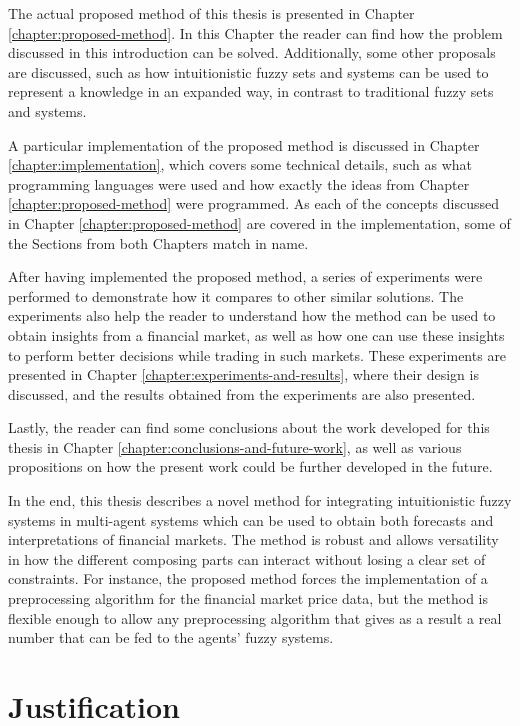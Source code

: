 The actual proposed method of this thesis is presented in Chapter
\ref{chapter:proposed-method}. In this Chapter the reader can find how the
problem discussed in this introduction can be
solved. Additionally, some other proposals are discussed, such as how
intuitionistic fuzzy sets and systems can be used to represent a knowledge in an
expanded way, in contrast to traditional fuzzy sets and systems.

A particular implementation of the proposed method is discussed in Chapter
\ref{chapter:implementation}, which covers some technical details, such as what
programming languages were used and how exactly the ideas from Chapter
\ref{chapter:proposed-method} were programmed. As each of the concepts discussed
in Chapter \ref{chapter:proposed-method} are covered in the implementation, some
of the Sections from both Chapters match in name.

After having implemented the proposed method, a series of experiments were
performed to demonstrate how it compares to other similar solutions. The
experiments also help the reader to understand how the method can be used to
obtain insights from a financial market, as well as how one can use these
insights to perform better decisions while trading in such markets. These %
experiments are presented in Chapter \ref{chapter:experiments-and-results}, where their
design is discussed, and the results obtained from the experiments are also presented.

Lastly, the reader can find some conclusions about the work developed for this
thesis in Chapter \ref{chapter:conclusions-and-future-work}, as well as various propositions on
how the present work could be further developed in the future.

In the end, this thesis describes a novel method for integrating intuitionistic fuzzy systems in multi-agent systems which can be used to obtain both forecasts and interpretations of financial markets. The method is robust and allows versatility in how the
different composing parts can interact without losing a clear set of
constraints. For instance, the proposed method forces the implementation of a
preprocessing algorithm for the financial market price data, but the method is
flexible enough to allow any preprocessing algorithm that gives as a result a
real number that can be fed to the agents' fuzzy systems.

\section{Justification}
\label{section:justification}

